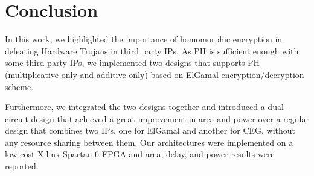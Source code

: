 \documentclass[conference]{IEEEtran}
\begin{document}
\section{Conclusion} \label{sec:conc}

In this work, we highlighted the importance of homomorphic encryption in defeating Hardware Trojans in third party IPs. As PH is sufficient enough with some third party IPs, we implemented two designs that supports PH (multiplicative only and additive only) based on ElGamal encryption/decryption scheme. 

Furthermore, we integrated the two designs together and introduced a dual-circuit design that achieved a great improvement in area and power over a regular design that combines two IPs, one for ElGamal and another for CEG, without any resource sharing between them. Our architectures were implemented on a low-cost Xilinx Spartan-6 FPGA and area, delay, and power results were reported. 



\end{document}
